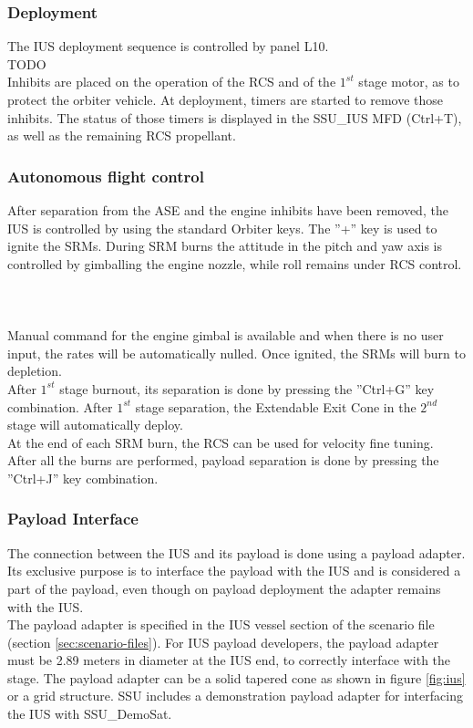 \documentclass[Space_Shuttle_Ultra_Manual.tex]{subfiles}
\begin{document}
\begin{multicols*}{2}
\subsubsection{Deployment}
The IUS deployment sequence is controlled by panel L10.
\\
TODO
\\
Inhibits are placed on the operation of the RCS and of the $1^{st}$ stage motor, as to protect the orbiter vehicle. At deployment, timers are started to remove those inhibits. The status of those timers is displayed in the SSU\_IUS MFD (Ctrl+T), as well as the remaining RCS propellant.

\subsubsection{Autonomous flight control}
After separation from the ASE and the engine inhibits have been removed, the IUS is controlled by using the standard Orbiter keys. The ''+'' key is used to ignite the SRMs. During SRM burns the attitude in the pitch and yaw axis is controlled by gimballing the engine nozzle, while roll remains under RCS control.
\\
\\
\\
\\
Manual command for the engine gimbal is available and when there is no user input, the rates will be automatically nulled. Once ignited, the SRMs will burn to depletion.\\
After $1^{st}$ stage burnout, its separation is done by pressing the ''Ctrl+G'' key combination. After $1^{st}$ stage separation, the Extendable Exit Cone in the $2^{nd}$ stage will automatically deploy.\\
At the end of each SRM burn, the RCS can be used for velocity fine tuning.\\
After all the burns are performed, payload separation is done by pressing the ''Ctrl+J'' key combination.

\subsubsection{Payload Interface}
The connection between the IUS and its payload is done using a payload adapter. Its exclusive purpose is to interface the payload with the IUS and is considered a part of the payload, even though on payload deployment the adapter remains with the IUS.\\
The payload adapter is specified in the IUS vessel section of the scenario file (section \ref{sec:scenario-files}).
For IUS payload developers, the payload adapter must be 2.89 meters in diameter at the IUS end, to correctly interface with the stage. The payload adapter can be a solid tapered cone as shown in figure \ref{fig:ius} or a grid structure. SSU includes a demonstration payload adapter for interfacing the IUS with SSU\_DemoSat.\\

\end{multicols*}
\end{document}
